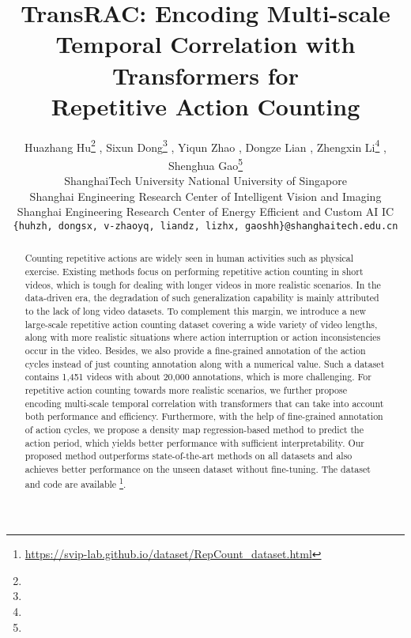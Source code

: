 \documentclass[10pt,twocolumn,letterpaper]{article}
\begin{document}
\title{TransRAC: Encoding Multi-scale Temporal Correlation with Transformers for \\
Repetitive Action  Counting}
\renewcommand{\thefootnote}{\fnsymbol{footnote}} 

\author{Huazhang Hu\footnote[1]{} ,   Sixun Dong\footnote[1]{} , Yiqun Zhao , Dongze Lian ,  Zhengxin Li\footnote[2]{} , Shenghua Gao\footnote[2]{}\\
ShanghaiTech University \qquad National University of Singapore\\
Shanghai Engineering Research Center of Intelligent Vision and Imaging\\
Shanghai Engineering Research Center of Energy Efficient and Custom AI IC\\
{\tt\small   \{huhzh, dongsx, v-zhaoyq, liandz,  lizhx, gaoshh\}@shanghaitech.edu.cn}\\
}
\maketitle

  

\renewcommand*{\thefootnote}{\arabic{footnote}}
\setcounter{footnote}{0}
\begin{abstract}
Counting repetitive actions are widely seen in human activities such as physical exercise. Existing methods focus on performing repetitive action counting in short videos, which is tough for dealing with longer videos in more realistic scenarios. In the data-driven era, the degradation of such generalization capability is mainly attributed to the lack of long video datasets. To complement this margin, we introduce a new large-scale repetitive action counting dataset covering a wide variety of video lengths, along with more realistic situations where action interruption or action inconsistencies occur in the video. Besides, we also provide a fine-grained annotation of the action cycles instead of just counting annotation along with a numerical value. 
Such a dataset contains 1,451 videos with about 20,000 annotations, which is more challenging. For repetitive action counting towards more realistic scenarios, we further propose encoding multi-scale temporal correlation with transformers that can take into account both performance and efficiency. Furthermore, with the help of fine-grained annotation of action cycles, we propose a density map regression-based method to predict the action period, which yields better performance with sufficient interpretability. Our proposed method outperforms state-of-the-art methods on all datasets and also achieves better performance on the unseen dataset without fine-tuning. The dataset and code are available \footnote{\url{https://svip-lab.github.io/dataset/RepCount_dataset.html}}.
\end{abstract}
\end{document}
